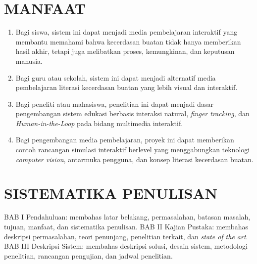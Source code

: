 \documentclass[10pt,twoside,openright]{report}
\begin{document}
\section{MANFAAT}
\label{sec:manfaat}

\begin{enumerate}
    \item Bagi siswa, sistem ini dapat menjadi media pembelajaran interaktif yang membantu memahami bahwa kecerdasan buatan tidak hanya memberikan hasil akhir, tetapi juga melibatkan proses, kemungkinan, dan keputusan manusia.
    \item Bagi guru atau sekolah, sistem ini dapat menjadi alternatif media pembelajaran literasi kecerdasan buatan yang lebih visual dan interaktif.
    \item Bagi peneliti atau mahasiswa, penelitian ini dapat menjadi dasar pengembangan sistem edukasi berbasis interaksi natural, \textit{finger tracking}, dan \textit{Human-in-the-Loop} pada bidang multimedia interaktif.
    \item Bagi pengembangan media pembelajaran, proyek ini dapat memberikan contoh rancangan simulasi interaktif berlevel yang menggabungkan teknologi \textit{computer vision}, antarmuka pengguna, dan konsep literasi kecerdasan buatan.
\end{enumerate}

\section{SISTEMATIKA PENULISAN}
\label{sec:sistematika-penulisan}

BAB I Pendahuluan: membahas latar belakang, permasalahan, batasan masalah, tujuan, manfaat, dan sistematika penulisan. BAB II Kajian Pustaka: membahas deskripsi permasalahan, teori penunjang, penelitian terkait, dan \textit{state of the art}. BAB III Deskripsi Sistem: membahas deskripsi solusi, desain sistem, metodologi penelitian, rancangan pengujian, dan jadwal penelitian.


\end{document}
